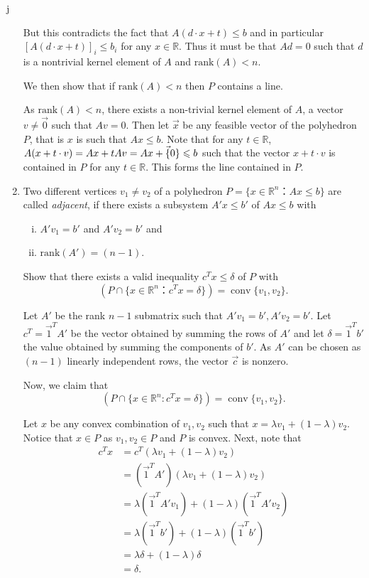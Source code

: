 j\documentclass[11pt]{article}
\DeclareMathOperator{\conv}{conv}
\newcommand{\setR}{\mathbb{R}}
\renewcommand{\leq}{\leqslant}
\newcommand{\rank}{\mathrm{rank}}
\begin{document}
\begin{enumerate}[1)]
\begin{solution}
  But this contradicts the fact that $A(d\cdot x +t) \leq b$ and in particular $[A(d\cdot x +t)]_i \leq b_i$ for any $x \in \setR$. Thus it must be that $Ad= 0$ such that $d$ is a nontrivial kernel element of $A$ and $\rank(A) < n$. 
  
  
  
  
  
  We then show that if $\rank(A) < n$ then $P$ contains a line. 
  
  As $\rank(A) <n$, there exists a non-trivial kernel element of $A$, a vector $v \neq \vec{0}$ such that $Av = 0$. Then let $\vec{x}$ be any feasible vector of the polyhedron $P$, that is $x$ is such that $Ax \leq b$. Note that for any $t \in \setR$, $A(x+ t\cdot v) = Ax + tAv = Ax + \vec\{0\} \leq b$ such that the vector $x + t \cdot v$ is contained in $P$ for any $t \in \setR$. This forms the line contained in $P$.  
  \end{solution}

\item \label{item:11} Two different vertices $v_1 ≠ v_2$ of a polyhedron $P = \{ x ∈ ℝ^n ： Ax≤b\}$ are called \emph{adjacent}, if there exists a subsystem $A'x ≤ b'$ of $Ax≤b$ with
\begin{enumerate}[i)] 
\item $A'v_1 = b'$ and $A'v_2 = b'$  and
\item $\rank(A') = (n-1)$. 
\end{enumerate}

Show that there exists a valid inequality $c^Tx ≤ δ$ of $P$ with
\begin{displaymath}
 \left( P ∩ \{ x ∈ ℝ^n ： c^Tx = δ \} \right) = \conv\{v_1,v_2\}. 
\end{displaymath}



\begin{solution}
Let $A'$ be the rank $n-1$ submatrix such that $A'v_1 = b', A'v_2 = b'$. Let $c^T = \vec{1}^TA'$ be the vector obtained by summing the rows of $A'$ and let $\delta = \vec{1}^Tb'$ the value obtained by summing the components of $b'$. As $A'$ can be chosen as $(n-1)$ linearly independent rows, the vector $\vec{c}$ is nonzero. 

Now, we claim that $$(P \cap \{x \in \setR^n: c^Tx = \delta\}) = \conv\{v_1, v_2\}.$$

Let $x$ be any convex combination of $v_1, v_2$ such that $x = \lambda v_1 + (1 - \lambda)v_2$. Notice that $x \in P$ as $v_1, v_2 \in P$ and $P$ is convex. Next, note that
\begin{align*}
c^Tx & = c^T ( \lambda v_1 + (1 - \lambda)v_2) \\
& = (\vec{1}^TA') (\lambda v_1 + (1 - \lambda)v_2) \\
& = \lambda (\vec{1}^T A' v_1) + (1-\lambda)(\vec{1}^TA' v_2) \\
& = \lambda (\vec{1}^T b') + (1-\lambda)(\vec{1}^T b') \\
& = \lambda \delta + (1-\lambda)\delta \\
& = \delta. 
\end{align*}


\end{solution}
\end{enumerate}
\end{document}
